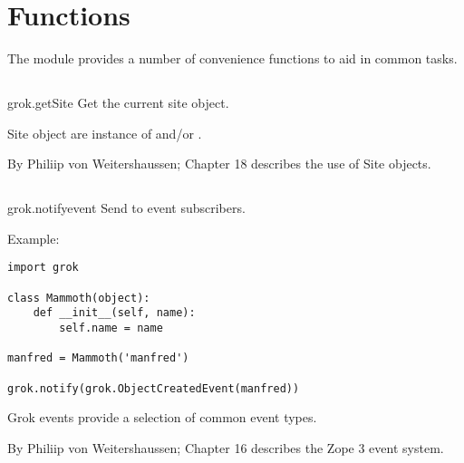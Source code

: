 \chapter{Functions}

The  module provides a number of convenience functions to aid in
common tasks.

  \section{}

    \begin{funcdesc}{grok.getSite}{}
    Get the current site object.

      \begin{seealso}
      Site object are instance of  and/or
      .
      \end{seealso}

      \begin{seealso}
      {By Philiip von Weitershaussen; Chapter 18 describes the use of Site
      objects.}
      \end{seealso}

    \end{funcdesc}

  \section{}

    \begin{funcdesc}{grok.notify}{event}
    Send  to event subscribers.

    Example:
\begin{verbatim}
import grok

class Mammoth(object):
    def __init__(self, name):
        self.name = name

manfred = Mammoth('manfred')

grok.notify(grok.ObjectCreatedEvent(manfred))
\end{verbatim}

      \begin{seealso}
      Grok events provide a selection of common event types.
      \end{seealso}

      \begin{seealso}
      {By Philiip von Weitershaussen; Chapter 16 describes the Zope 3 event
      system.}
      \end{seealso}

    \end{funcdesc}

